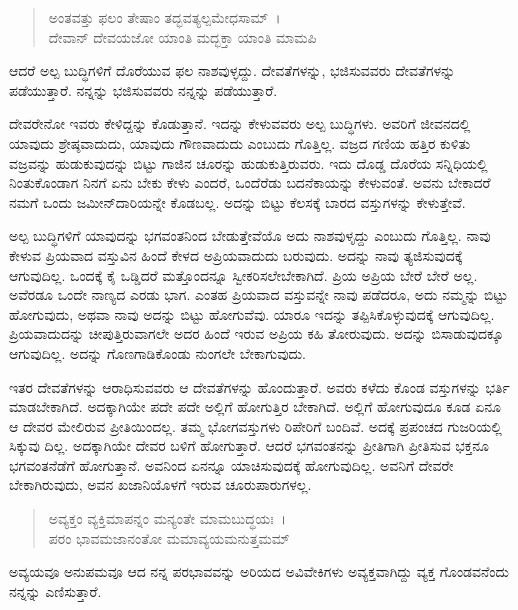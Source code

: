 \begin{verse}
ಅಂತವತ್ತು ಫಲಂ ತೇಷಾಂ ತದ್ಭವತ್ಯಲ್ಪಮೇಧಸಾಮ್~।\\ದೇವಾನ್ ದೇವಯಜೋ ಯಾಂತಿ ಮದ್ಭಕ್ತಾ ಯಾಂತಿ ಮಾಮಪಿ 
\end{verse}

{\small ಆದರೆ ಅಲ್ಪ ಬುದ್ಧಿಗಳಿಗೆ ದೊರೆಯುವ ಫಲ ನಾಶವುಳ್ಳದ್ದು. ದೇವತೆಗಳನ್ನು, ಭಜಿಸುವವರು ದೇವತೆಗಳನ್ನು ಪಡೆಯುತ್ತಾರೆ. ನನ್ನನ್ನು ಭಜಿಸುವವರು ನನ್ನನ್ನು ಪಡೆಯುತ್ತಾರೆ.}

ದೇವರೇನೋ ಇವರು ಕೇಳಿದ್ದನ್ನು ಕೊಡುತ್ತಾನೆ. ಇದನ್ನು ಕೇಳುವವರು ಅಲ್ಪ ಬುದ್ಧಿಗಳು. ಅವರಿಗೆ ಜೀವನದಲ್ಲಿ ಯಾವುದು ಶ್ರೇಷ್ಠವಾದುದು, ಯಾವುದು ಗೌಣವಾದುದು ಎಂಬುದು ಗೊತ್ತಿಲ್ಲ. ವಜ್ರದ ಗಣಿಯ ಹತ್ತಿರ ಕುಳಿತು ವಜ್ರವನ್ನು ಹುಡುಕುವುದನ್ನು ಬಿಟ್ಟು ಗಾಜಿನ ಚೂರನ್ನು ಹುಡುಕುತ್ತಿರುವರು. ಇದು ದೊಡ್ಡ ದೊರೆಯ ಸನ್ನಿಧಿಯಲ್ಲಿ ನಿಂತುಕೊಂಡಾಗ ನಿನಗೆ ಏನು ಬೇಕು ಕೇಳು ಎಂದರೆ, ಒಂದೆರೆಡು ಬದನೆಕಾಯನ್ನು ಕೇಳುವಂತೆ. ಅವನು ಬೇಕಾದರೆ ನಮಗೆ ಒಂದು ಜಮೀನ್​ದಾರಿಯನ್ನೇ ಕೊಡಬಲ್ಲ. ಅದನ್ನು ಬಿಟ್ಟು ಕೆಲಸಕ್ಕೆ ಬಾರದ ವಸ್ತುಗಳನ್ನು ಕೇಳುತ್ತೇವೆ.

ಅಲ್ಪ ಬುದ್ಧಿಗಳಿಗೆ ಯಾವುದನ್ನು ಭಗವಂತನಿಂದ ಬೇಡುತ್ತೇವೆಯೊ ಅದು ನಾಶವುಳೃದ್ದು ಎಂಬುದು ಗೊತ್ತಿಲ್ಲ. ನಾವು ಕೇಳುವ ಪ್ರಿಯವಾದ ವಸ್ತುವಿನ ಹಿಂದೆ ಕೇಳದ ಅಪ್ರಿಯವಾದುದು ಬರುವುದು. ಅದನ್ನು ನಾವು ತ್ಯಜಿಸುವುದಕ್ಕೆ ಆಗುವುದಿಲ್ಲ. ಒಂದಕ್ಕೆ ಕೈ ಒಡ್ಡಿದರೆ ಮತ್ತೊಂದನ್ನೂ ಸ್ವೀಕರಿಸಲೇಬೇಕಾಗಿದೆ. ಪ್ರಿಯ ಅಪ್ರಿಯ ಬೇರೆ ಬೇರೆ ಅಲ್ಲ. ಅವೆರಡೂ ಒಂದೇ ನಾಣ್ಯದ ಎರಡು ಭಾಗ. ಎಂತಹ ಪ್ರಿಯವಾದ ವಸ್ತುವನ್ನೇ ನಾವು ಪಡೆದರೂ, ಅದು ನಮ್ಮನ್ನು ಬಿಟ್ಟು ಹೋಗುವುದು, ಅಥವಾ ನಾವು ಅದನ್ನು ಬಿಟ್ಟು ಹೋಗುವೆವು. ಯಾರೂ ಇದನ್ನು ತಪ್ಪಿಸಿಕೊಳ್ಳುವುದಕ್ಕೆ ಆಗುವುದಿಲ್ಲ. ಪ್ರಿಯವಾದುದನ್ನು ಚೀಪುತ್ತಿರುವಾಗಲೇ ಅದರ ಹಿಂದೆ ಇರುವ ಅಪ್ರಿಯ ಕಹಿ ತೋರುವುದು. ಅದನ್ನು ಬಿಸಾಡುವುದಕ್ಕೂ ಆಗುವುದಿಲ್ಲ. ಅದನ್ನು ಗೊಣಗಾಡಿಕೊಂಡು ನುಂಗಲೇ ಬೇಕಾಗುವುದು.

ಇತರ ದೇವತೆಗಳನ್ನು ಆರಾಧಿಸುವವರು ಆ ದೇವತೆಗಳನ್ನು ಹೊಂದುತ್ತಾರೆ. ಅವರು ಕಳೆದು ಕೊಂಡ ವಸ್ತುಗಳನ್ನು ಭರ್ತಿ ಮಾಡಬೇಕಾಗಿದೆ. ಅದಕ್ಕಾಗಿಯೇ ಪದೇ ಪದೇ ಅಲ್ಲಿಗೆ ಹೋಗುತ್ತಿರ ಬೇಕಾಗಿದೆ. ಅಲ್ಲಿಗೆ ಹೋಗುವುದೂ ಕೂಡ ಏನೂ ಆ ದೇವರ ಮೇಲಿರುವ ಪ್ರೀತಿಯಿಂದಲ್ಲ. ತಮ್ಮ ಭೋಗವಸ್ತುಗಳು ರಿಪೇರಿಗೆ ಬಂದಿವೆ. ಅದಕ್ಕೆ  ಪ್ರಪಂಚದ ಗುಜರಿಯಲ್ಲಿ ಸಿಕ್ಕುವು ದಿಲ್ಲ. ಅದಕ್ಕಾಗಿಯೇ ದೇವರ ಬಳಿಗೆ ಹೋಗುತ್ತಾರೆ. ಆದರೆ ಭಗವಂತನನ್ನು ಪ್ರೀತಿಗಾಗಿ ಪ್ರೀತಿಸುವ ಭಕ್ತನೂ ಭಗವಂತನೆಡೆಗೆ ಹೋಗುತ್ತಾನೆ. ಅವನಿಂದ ಏನನ್ನೂ ಯಾಚಿಸುವುದಕ್ಕೆ ಹೋಗುವುದಿಲ್ಲ. ಅವನಿಗೆ ದೇವರೇ ಬೇಕಾಗಿರುವುದು, ಅವನ ಖಜಾನಿಯೊಳಗೆ ಇರುವ ಚೂರುಪಾರುಗಳಲ್ಲ.

\begin{verse}
ಅವ್ಯಕ್ತಂ ವ್ಯಕ್ತಿಮಾಪನ್ನಂ ಮನ್ಯಂತೇ ಮಾಮಬುದ್ಧಯಃ~।\\ಪರಂ ಭಾವಮಜಾನಂತೋ ಮಮಾವ್ಯಯಮನುತ್ತಮಮ್ 
\end{verse}

{\small ಅವ್ಯಯವೂ ಅನುಪಮವೂ ಆದ ನನ್ನ ಪರಭಾವವನ್ನು ಅರಿಯದ ಅವಿವೇಕಿಗಳು ಅವ್ಯಕ್ತವಾಗಿದ್ದು ವ್ಯಕ್ತ ಗೊಂಡವನೆಂದು ನನ್ನನ್ನು ಎಣಿಸುತ್ತಾರೆ.}

